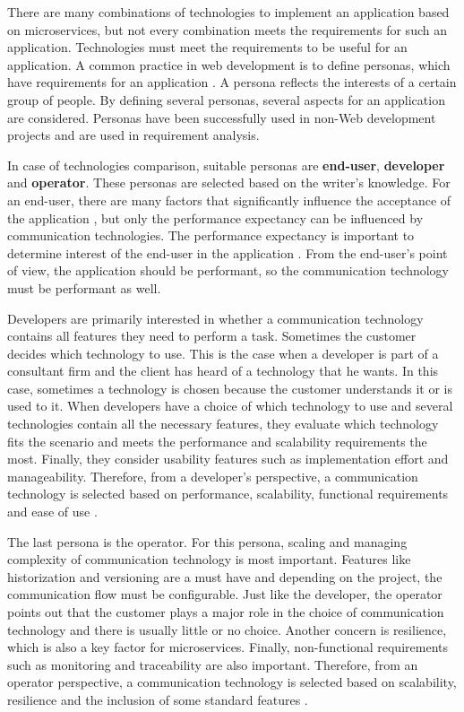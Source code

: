 
There are many combinations of technologies to implement an application based on microservices, but not every combination meets the requirements for such an application.
Technologies must meet the requirements to be useful for an application.
A common practice in web development is to define personas, which have requirements for an application \cite[p. 105]{Castro.2008}.
A persona reflects the interests of a certain group of people.
By defining several personas, several aspects for an application are considered.
Personas have been successfully used in non-Web development projects \cite[P. 105]{Castro.2008} and are used in requirement analysis.

In case of technologies comparison, suitable personas are \textbf{end-user}, \textbf{developer} and \textbf{operator}.
These personas are selected based on the writer's knowledge.
For an end-user, there are many factors that significantly influence the acceptance of the application \cite[p. 245]{Zhou.2008}, but only the performance expectancy can be influenced by communication technologies.
The performance expectancy is important to determine interest of the end-user in the application \cite[p. 244]{Zhou.2008}.
From the end-user's point of view, the application should be performant, so the communication technology must be performant as well.

Developers are primarily interested in whether a communication technology contains all features they need to perform a task.
Sometimes the customer decides which technology to use.
This is the case when a developer is part of a consultant firm and the client has heard of a technology that he wants.
In this case, sometimes a technology is chosen because the customer understands it or is used to it.
When developers have a choice of which technology to use and several technologies contain all the necessary features, they evaluate which technology fits the scenario and meets the performance and scalability requirements the most.
Finally, they consider usability features such as implementation effort and manageability.
Therefore, from a developer's perspective, a communication technology is selected based on performance, scalability, functional requirements and ease of use \cite{ManagingSolutionArchitect.20.05.2020}.

The last persona is the operator.
For this persona, scaling and managing complexity of communication technology is most important.
Features like historization and versioning are a must have and depending on the project, the communication flow must be configurable.
Just like the developer, the operator points out that the customer plays a major role in the choice of communication technology and there is usually little or no choice. Another concern is resilience, which is also a key factor for microservices.
Finally, non-functional requirements such as monitoring and traceability are also important.
Therefore, from an operator perspective, a communication technology is selected based on scalability, resilience and the inclusion of some standard features \cite{EnterpriseArchitectforcloudbasedinfrastructure.20.05.2020}.

